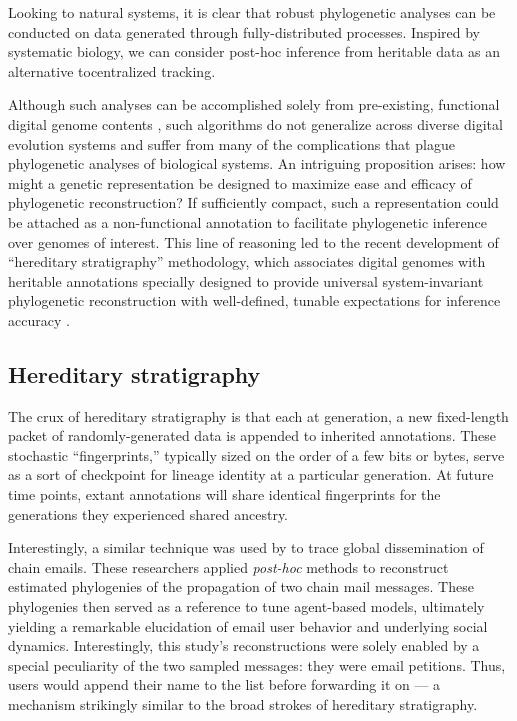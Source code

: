 Looking to natural systems, it is clear that robust phylogenetic analyses can be conducted on data generated through fully-distributed processes.
Inspired by systematic biology, we can consider post-hoc inference from heritable data as an alternative tocentralized tracking.

Although such analyses can be accomplished solely from pre-existing, functional digital genome contents \citep{moreno2021case}, such algorithms do not generalize across diverse digital evolution systems and suffer from many of the complications that plague phylogenetic analyses of biological systems.
An intriguing proposition arises: how might a genetic representation be designed to maximize ease and efficacy of phylogenetic reconstruction?
If sufficiently compact, such a representation could be attached as a non-functional annotation to facilitate phylogenetic inference over genomes of interest.
This line of reasoning led to the recent development of ``hereditary stratigraphy'' methodology, which associates digital genomes with heritable annotations specially designed to provide universal system-invariant phylogenetic reconstruction with well-defined, tunable expectations for inference accuracy
\citep{moreno2022hereditary}.


\subsection{Hereditary stratigraphy}

The crux of hereditary stratigraphy is that each at generation, a new fixed-length packet of randomly-generated data is appended to inherited annotations.
These stochastic ``fingerprints,'' typically sized on the order of a few bits or bytes, serve as a sort of checkpoint for lineage identity at a particular generation.
At future time points, extant annotations will share identical fingerprints for the generations they experienced shared ancestry.

Interestingly, a similar technique was used by \cite{libennowell2008tracing} to trace global dissemination of chain emails.
These researchers applied \textit{post-hoc} methods to reconstruct estimated phylogenies of the propagation of two chain mail messages.
These phylogenies then served as a reference to tune agent-based models, ultimately yielding a remarkable elucidation of email user behavior and underlying social dynamics.
Interestingly, this study's reconstructions were solely enabled by a special peculiarity of the two sampled messages: they were email petitions.
Thus, users would append their name to the list before forwarding it on --- a mechanism strikingly similar to the broad strokes of hereditary stratigraphy.

